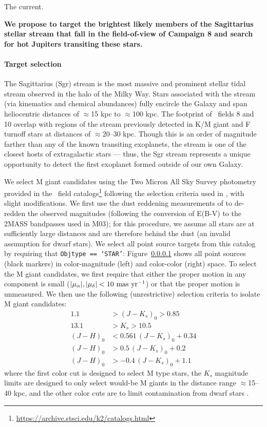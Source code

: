 \documentclass[letterpaper,12pt,preprint]{hack_aastex}
\begin{document}
The current.

{\bf We propose to target the brightest likely members of the Sagittarius
stellar stream that fall in the field-of-view of Campaign 8 and search for hot
Jupiters transiting these stars.}

\paragraph{Target selection}

The Sagittarius (Sgr) stream is the most massive and prominent stellar tidal stream observed in the halo of the Milky Way. Stars associated with the stream (via kinematics and chemical abundances) fully encircle the Galaxy and span heliocentric distances of $\approx$15 kpc to $\approx$100 kpc. The footprint of \KT\ fields 8 and 10 overlap with regions of the stream previously detected in K/M giant and F turnoff stars \citep{Majewski:2003, Yanny:2009} at distances of $\approx$20--30 kpc. Though this is an order of magnitude farther than any of the known transiting exoplanets, the stream is one of the closest hosts of extragalactic stars --- thus, the Sgr stream represents a unique opportunity to detect the first exoplanet formed outside of our own Galaxy.

We select M giant candidates using the Two Micron All Sky Survey \citep[2MASS; ][]{Skrutskie:2006} photometry provided in the \KT\ field catalogs\footnote{\url{https://archive.stsci.edu/k2/catalogs.html}} following the selection criteria used in \cite[][hereafter M03]{Majewski:2003}, with slight modifications. We first use the dust reddening measurements of \cite{Schlafly:2011} to de-redden the observed magnitudes (following the conversion of E(B-V) to the 2MASS bandpasses used in M03); for this procedure, we assume all stars are at sufficiently large distances and are therefore behind the dust (an invalid assumption for dwarf stars). We select all point source targets from this catalog by requiring that \texttt{Objtype == `STAR'}: Figure~\ref{} shows all point sources (black markers) in color-magnitude (left) and color-color (right) space. To select the M giant candidates, we first require that either the proper motion in any component is small ($|\mu_\alpha |,|\mu_\delta | < 10~{\rm mas}~{\rm yr}^{-1}$) or that the proper motion is unmeasured. We then use the following (unrestrictive) selection criteria to isolate M giant candidates:
\begin{align} %
	1.1 &> (J-K_s)_0 > 0.85 \\
	13.1 &> K_s > 10.5\\
	(J-H)_0 &< 0.561\,(J-K_s)_0 + 0.34\\
	(J-H)_0 &> 0.5\,(J-K_s)_0 + 0.2\\
	(J-H)_0 &> -0.4\,(J-K_s)_0 + 1.1
\end{align}
where the first color cut is designed to select M type stars, the $K_s$ magnitude limits are designed to only select would-be M giants in the distance range $\approx$15--40 kpc, and the other color cuts are to limit contamination from dwarf stars \citep[e.g.,][]{Majewski:2003}.
\end{document}
